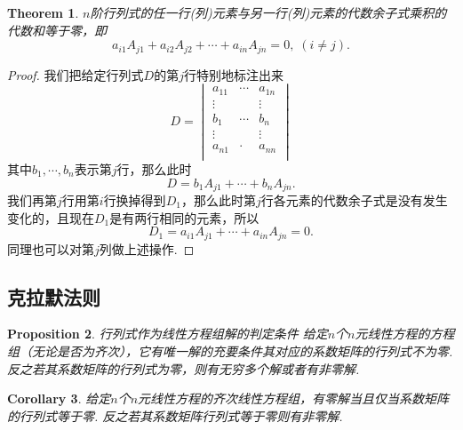 \documentclass{article}
\newtheorem{theorem}{Theorem}[section]
\newtheorem{corollary}[theorem]{Corollary}
\newtheorem{proposition}[theorem]{Proposition}
\begin{document}
\begin{theorem}\label{hls: zk2}
\rm $n$阶行列式的任一行(列)元素与另一行(列)元素的代数余子式乘积的代数和等于零，即
$$
a_{i1}A_{j1} + a_{i2}A_{j2} + \cdots + a_{in}A_{jn} = 0,\;(i\neq j).
$$
\end{theorem}


\begin{proof}
我们把给定行列式$D$的第$j$行特别地标注出来
$$
D=
\begin{vmatrix}
a_{11} & \cdots & a_{1n} \\
\vdots && \vdots \\
b_1 & \cdots & b_n \\
\vdots && \vdots \\
a_{n1} & \cdot & a_{nn} \\
\end{vmatrix}
$$
其中$b_1,\cdots,b_n$表示第$j$行，那么此时
$$
D = b_1A_{j1} + \cdots +b_nA_{jn}.
$$
我们再第$j$行用第$i$行换掉得到$D_1$，那么此时第$j$行各元素的代数余子式是没有发生变化的，且现在$D_1$是有两行相同的元素，所以
$$
D_1 = a_{i1}A_{j1} + \cdots + a_{in}A_{jn} = 0.
$$
同理也可以对第$j$列做上述操作.
\end{proof}

\newpage
\subsection{克拉默法则}

\begin{proposition}
\rm {\color{red} 行列式作为线性方程组解的判定条件} 给定$n$个$n$元线性方程的方程组（无论是否为齐次），它有唯一解的充要条件其对应的系数矩阵的行列式不为零. 反之若其系数矩阵的行列式为零，则有无穷多个解或者有非零解.
\end{proposition}

\begin{corollary}
\rm 给定$n$个$n$元线性方程的齐次线性方程组，有零解当且仅当系数矩阵的行列式等于零. 反之若其系数矩阵行列式等于零则有非零解.
\end{corollary}
\end{document}

